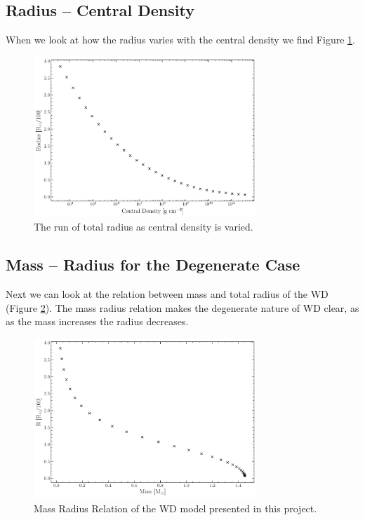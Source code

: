 \subsection{Radius -- Central Density}
When we look at how the radius varies with the central density we find Figure \ref{fig:WDRRho}.
\begin{figure}[ht!]
    \centering
    \includegraphics[width=0.75\textwidth]{Graphics/WD_R_Rho.pdf}
    \caption{The run of total radius as central density is varied.}
    \label{fig:WDRRho}
\end{figure}
\subsection{Mass -- Radius for the Degenerate Case}
Next we can look at the relation between mass and total radius of the WD (Figure \ref{fig:WDMR}). The mass radius relation makes the degenerate nature of WD clear, as as the mass increases the radius decreases.
\begin{figure}[ht!]
    \centering
    \includegraphics[width=0.75\textwidth]{Graphics/WD_M_R.pdf}
    \caption{Mass Radius Relation of the WD model presented in this project.}
    \label{fig:WDMR}
\end{figure}
